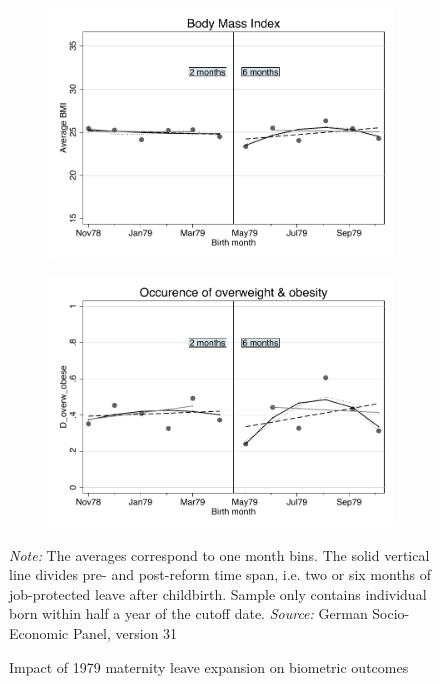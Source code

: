 \documentclass[a4paper ]{article}
\begin{document}
\begin{figure}[p]
\begin{subfigure}[h]{0.48\textwidth}\centering
	\includegraphics[width=\textwidth]{../../analysis/graphs/SOEP/BMI_RD.pdf}
\end{subfigure}
\quad
\begin{subfigure}[h]{0.48\textwidth}\centering
	\includegraphics[width=\textwidth]{../../analysis/graphs/SOEP/D_overw_obese_RD.pdf}
\end{subfigure}
\caption{Impact of 1979 maternity leave expansion on biometric outcomes}\label{fig: RD_BM}
\begin{minipage}{\textwidth} %
{\footnotesize \textit{Note:} The averages correspond to one month bins. The solid vertical line divides pre- and post-reform time span, i.e. two or six months of job-protected leave after childbirth. Sample only contains individual born within half a year of the cutoff date. \newline \textit{Source: }German Socio-Economic Panel, version 31\par}
\end{minipage}
\end{figure}
\end{document}
